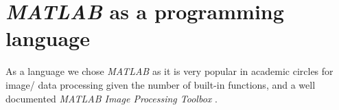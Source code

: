 %
%
%	
%	


\section{\textit{MATLAB} as a programming language}

As a language we chose \textit{MATLAB} as it is very popular in academic circles for image/ data processing given the number of built-in functions, and a well documented \textit{MATLAB Image Processing Toolbox} \cite{matlab}.

